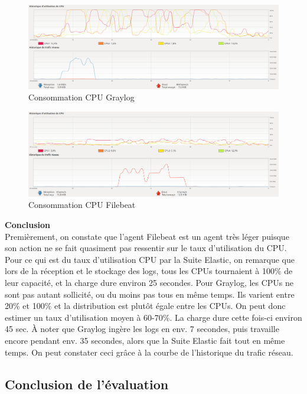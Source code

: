 \documentclass[paper=a4, fontsize=11pt]{scrartcl}
\begin{document}
\begin{figure}[H]
    \centering
    \includegraphics[width=18cm]{img/screenshots/Graylog_CPU_MEM_Receive_modified.png}
    \caption{Consommation CPU Graylog}
    \label{f-GraylogCPU}
\end{figure}

\begin{figure}[H]
    \centering
    \includegraphics[width=18cm]{img/screenshots/Filebeat_send_modified.png}
    \caption{Consommation CPU Filebeat}
    \label{f-FilebeatCPU}
\end{figure}

\textbf{Conclusion} \\
Premièrement, on constate que l'agent Filebeat est un agent très léger puisque son action ne se fait quasiment pas ressentir sur le taux d'utilisation du CPU. Pour ce qui est du taux d'utilisation CPU par la Suite Elastic, on remarque que lors de la réception et le stockage des logs, tous les CPUs tournaient à 100\% de leur capacité, et la charge dure environ 25 secondes. Pour Graylog, les CPUs ne sont pas autant sollicité, ou du moins pas tous en même temps. Ils varient entre 20\% et 100\% et la distribution est plutôt égale entre les CPUs. On peut donc estimer un taux d'utilisation moyen à 60-70\%. La charge dure cette fois-ci environ 45 sec. À noter que Graylog ingère les logs en env. 7 secondes, puis travaille encore pendant env. 35 secondes, alors que la Suite Elastic fait tout en même temps. On peut constater ceci grâce à la courbe de l'historique du trafic réseau.

\subsection{Conclusion de l'évaluation}
\end{document}
